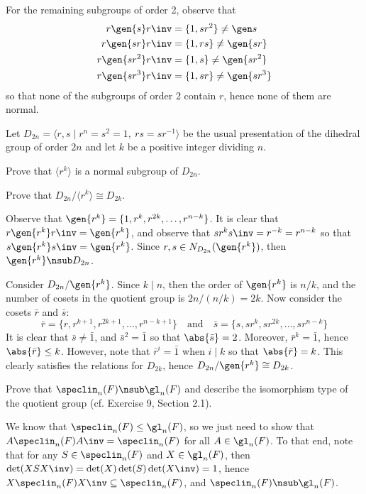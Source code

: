 \begin{problems}
\begin{sol}
        For the remaining subgroups of order 2, observe that
        \begin{align*}
            r\gen{s}r\inv & = \{1, sr^2\} \neq \gen s \\
            r\gen{sr}r\inv & = \{1, rs\} \neq \gen{sr} \\
            r\gen{sr^2}r\inv & = \{1, s\} \neq \gen{sr^2} \\
            r\gen{sr^3}r\inv & = \{1, sr\} \neq \gen{sr^3}
        \end{align*}
        so that none of the subgroups of order 2 contain $r$, hence none of them are normal.
    \end{sol}
    \item \label{ex3.1.34} Let $D_{2n} = \langle r,s \mid r^n = s^2 = 1,\ rs = sr^{-1} \rangle$ be the usual presentation of the dihedral group of order $2n$ and let $k$ be a positive integer dividing $n$.
    \begin{problems}
        \item Prove that $\langle r^k \rangle$ is a normal subgroup of $D_{2n}$.
        \item Prove that $D_{2n}/\langle r^k \rangle \cong D_{2k}$.
    \end{problems}
    \begin{solalph}
        \item Observe that $\gen{r^k} = \{1, r^k, r^{2k}, \ldots, r^{n - k}\}$. It is clear that $r\gen{r^k}r\inv = \gen{r^k}$, and observe that $sr^ks\inv = r^{-k} = r^{n - k}$ so that $s\gen{r^k}s\inv = \gen{r^k}$. Since $r, s \in N_{D_{2n}}(\gen{r^k})$, then $\gen{r^k} \nsub D_{2n}$.
        \item Consider $D_{2n}/\gen{r^k}$. Since $k \mid n$, then the order of $\gen{r^k}$ is $n/k$, and the number of cosets in the quotient group is $2n/(n/k) = 2k$. Now consider the cosets $\bar r$ and $\bar s$:
        \[\bar r = \{r, r^{k + 1}, r^{2k + 1}, \ldots, r^{n - k + 1}\} \quad \text{and} \quad \bar s = \{s, sr^k, sr^{2k}, \ldots, sr^{n - k}\}\]
        It is clear that $\bar s \neq \bar 1$, and $\bar s^2 = \bar 1$ so that $\abs{\bar s} = 2$. Moreover, $\bar r^k = \bar 1$, hence $\abs{\bar r} \leq k$. However, note that $\bar r^i = \bar 1$ when $i \mid k$ so that $\abs{\bar r} = k$. This clearly satisfies the relations for $D_{2k}$, hence $D_{2n}/\gen{r^k} \cong D_{2k}$. 
    \end{solalph}
    \item \label{ex3.1.35} Prove that $\speclin_n(F) \nsub \gl_n(F)$ and describe the isomorphism type of the quotient group (cf. Exercise 9, Section 2.1).
    \begin{sol}
        We know that $\speclin_n(F) \leq \gl_n(F)$, so we just need to show that $A \speclin_n(F) A\inv = \speclin_n(F)$ for all $A \in \gl_n(F)$. To that end, note that for any $S \in \speclin_n(F)$ and $X \in \gl_n(F)$, then $\det(XSX\inv) = \det(X)\det(S)\det(X\inv) = 1$, hence $X\speclin_n(F)X\inv \subseteq \speclin_n(F)$, and $\speclin_n(F) \nsub \gl_n(F)$.


\end{sol}
\end{problems}

